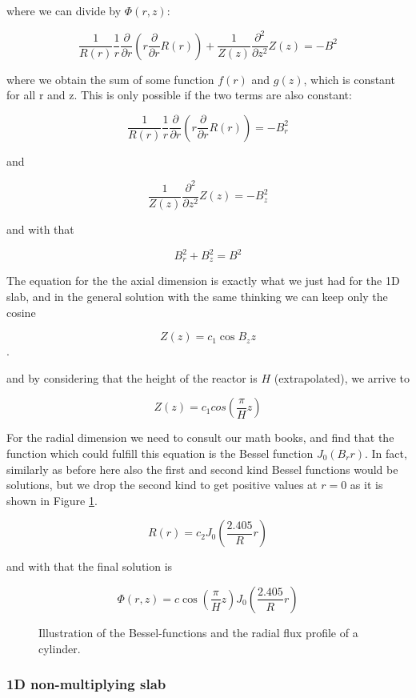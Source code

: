 \noindent where we can divide by $\Phi(r,z)$:

\[
\frac{1}{R(r)}\frac{1}{r}\frac{\partial}{\partial r}(r\frac{\partial}{\partial r}R(r))+\frac{1}{Z(z)}\frac{\partial^2}{\partial z^2}Z(z)=-B^2
\]

\noindent where we obtain the sum of some function $f(r)$ and $g(z)$, which is constant for all r and z. This is only possible if the two terms are also constant:


\[
\frac{1}{R(r)}\frac{1}{r}\frac{\partial}{\partial r}(r\frac{\partial}{\partial r}R(r))=-B_r^2
\]

\noindent and

\[
\frac{1}{Z(z)}\frac{\partial^2}{\partial z^2}Z(z)=-B_z^2
\]

\noindent and with that

\[
B_r^2+B_z^2=B^2
\]

The equation for the the axial dimension is exactly what we just had for the 1D slab, and in the general solution with the same thinking we can keep only the cosine 

\[
Z(z)=c_1\cos B_zz
\].  

\noindent and by considering that the height of the reactor is $H$ (extrapolated), we arrive to

\[
Z(z)=c_1cos(\frac{\pi}{H}z)
\]

For the radial dimension we need to consult our math books, and find that the function which could fulfill this equation is the Bessel function $J_0(B_rr)$. In fact, similarly as before here also the first and second kind Bessel functions would be solutions, but we drop the second kind to get positive values at $r=0$ as it is shown in Figure \ref{fig:cylinder}.

\[
R(r)=c_2J_0(\frac{2.405}{R}r)
\]

\noindent and with that the final solution is

\[
\Phi(r,z)=c\cos(\frac{\pi}{H}z)J_0(\frac{2.405}{R}r)
\]

\begin{figure}[ht!]
\protect {}\protect
\caption{\label{fig:cylinder} \footnotesize{Illustration of the Bessel-functions and the radial flux profile of a cylinder.}}
\end{figure} 

\subsubsection*{1D non-multiplying slab}

